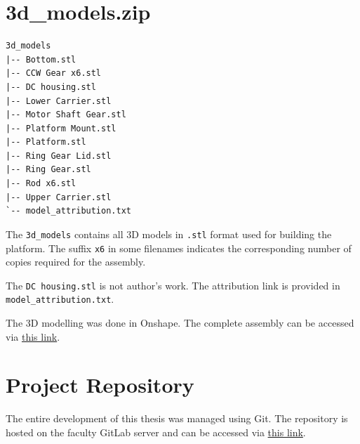 \section{3d\_models.zip}
\begin{verbatim}
3d_models
|-- Bottom.stl
|-- CCW Gear x6.stl
|-- DC housing.stl
|-- Lower Carrier.stl
|-- Motor Shaft Gear.stl
|-- Platform Mount.stl
|-- Platform.stl
|-- Ring Gear Lid.stl
|-- Ring Gear.stl
|-- Rod x6.stl
|-- Upper Carrier.stl
`-- model_attribution.txt
\end{verbatim}
The \texttt{3d\_models} contains all 3D models in \texttt{.stl} format used for building the platform. 
The suffix \texttt{x6} in some filenames indicates the corresponding number of copies required for the assembly.

The \texttt{DC housing.stl} is not author's work. The attribution link is provided in  \texttt{model\_attribution.txt}.

The 3D modelling was done in Onshape. The complete assembly can be accessed via \href{https://cad.onshape.com/documents/0d531e009de73b9ed4692d36/w/83d10e6192a92a79ef75f390/e/35ebef400ac87f1073d7eabc?renderMode=0&uiState=6a06f9cc76a0e4c598c450d3}{this link}.

\section{Project Repository}
The entire development of this thesis was managed using Git. The repository is hosted on the faculty GitLab server and can be accessed via \href{https://gitlab.fel.cvut.cz/novosill/bap-novosad}{this link}.